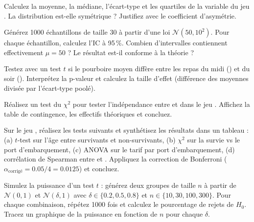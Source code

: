 \begin{exercice}[$\star$]
Calculez la moyenne, la m\'ediane, l'\'ecart-type et les quartiles de la variable  du jeu . La distribution est-elle sym\'etrique ? Justifiez avec le coefficient d'asym\'etrie.
\end{exercice}

\begin{exercice}[$\star$]
G\'en\'erez 1000 \'echantillons de taille 30 \`a partir d'une loi $\mathcal{N}(50, 10^2)$. Pour chaque \'echantillon, calculez l'IC \`a 95\,\%. Combien d'intervalles contiennent effectivement $\mu = 50$ ? Le r\'esultat est-il conforme \`a la th\'eorie ?
\end{exercice}

\begin{exercice}[$\star\star$]
Testez avec un test $t$ si le pourboire moyen diff\`ere entre les repas du midi () et du soir (). Interpr\'etez la p-valeur et calculez la taille d'effet (diff\'erence des moyennes divis\'ee par l'\'ecart-type pool\'e).
\end{exercice}

\begin{exercice}[$\star\star$]
R\'ealisez un test du $\chi^2$ pour tester l'ind\'ependance entre  et  dans le jeu . Affichez la table de contingence, les effectifs th\'eoriques et concluez.
\end{exercice}

\begin{exercice}[$\star\star\star$]
Sur le jeu , r\'ealisez les tests suivants et synth\'etisez les r\'esultats dans un tableau : (a) $t$-test sur l'\^age entre survivants et non-survivants, (b) $\chi^2$ sur la survie vs le port d'embarquement, (c) ANOVA sur le tarif par port d'embarquement, (d) corr\'elation de Spearman entre  et . Appliquez la correction de Bonferroni ($\alpha_{\text{corrig\'e}} = 0.05 / 4 = 0.0125$) et concluez.
\end{exercice}

\begin{exercice}[$\star\star\star$]
Simulez la puissance d'un test $t$ : g\'en\'erez deux groupes de taille $n$ \`a partir de $\mathcal{N}(0, 1)$ et $\mathcal{N}(\delta, 1)$ avec $\delta \in \{0.2, 0.5, 0.8\}$ et $n \in \{10, 30, 100, 300\}$. Pour chaque combinaison, r\'ep\'etez 1000 fois et calculez le pourcentage de rejets de $H_0$. Tracez un graphique de la puissance en fonction de $n$ pour chaque $\delta$.
\end{exercice}

